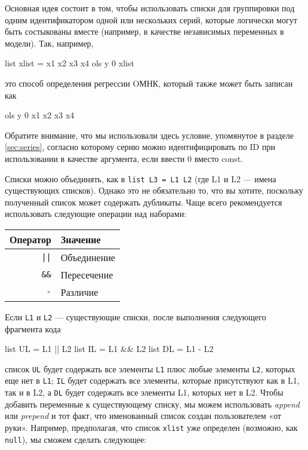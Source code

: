 Основная идея состоит в том, чтобы использовать списки для группировки
под одним идентификатором одной или нескольких серий, которые
логически могут быть состыкованы вместе (например, в качестве
независимых переменных в модели). Так, например,

\begin{code}
list xlist = x1 x2 x3 x4
ols y 0 xlist
\end{code}
это способ определения регрессии OМНК, который также может быть
записан как
\begin{code}
ols y 0 x1 x2 x3 x4
\end{code}
Обратите внимание, что мы использовали здесь условие, упомянутое в
разделе \ref{sec:series}, согласно которому серию можно
идентифицировать по ID при использовании в качестве аргумента, если
ввести 0 вместо const.

Списки можно объединять, как в \texttt{list L3 = L1 L2} (где L1 и L2
--- имена существующих списков).  Однако это не обязательно то, что вы
хотите, поскольку полученный список может содержать дубликаты. Чаще
всего рекомендуется использовать следующие операции над наборами:

\begin{center}
  \begin{tabular}{rl}
    \textbf{Оператор} & \textbf{Значение} \\
    \hline
    \verb,||, & Объединение \\
    \verb|&&| & Пересечение \\
    \verb|-|  & Различие \\
    \hline
  \end{tabular}
\end{center}

Если \texttt{L1} и \texttt{L2} --- существующие списки, после
выполнения следующего фрагмента кода
\begin{code}
  list UL = L1 || L2 
  list IL = L1 && L2
  list DL = L1 - L2
\end{code}
список \texttt{UL} будет содержать все элементы \texttt{L1} плюс любые
элементы \texttt{L2}, которых еще нет в \texttt{L1}; \texttt{IL} будет
содержать все элементы, которые присутствуют как в L1, так и в L2, а
\texttt{DL} будет содержать все элементы L1, которых нет в L2.  Чтобы
добавить переменные к существующему списку, мы можем использовать
\textit{append} или \textit{prepend} и тот факт, что именованный
список создан пользователем «от руки». Например, предполагая, что
список \texttt{xlist} уже определен (возможно, как \texttt{null}), мы
сможем сделать следующее:


